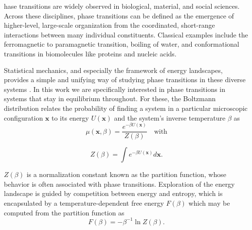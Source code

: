 \documentclass[9pt,twocolumn,twoside]{pnas-new}
\begin{document}
\label{sec:intro}


hase transitions are widely observed in biological, material, and social sciences. Across these disciplines, phase transitions can be defined as the emergence of higher-level, large-scale organization from the coordinated, short-range interactions between many individual constituents. Classical examples include the ferromagnetic to paramagnetic transition, boiling of water, and conformational transitions in biomolecules like proteins and nucleic acids.

Statistical mechanics, and especially the framework of energy landscapes, provides a simple and unifying way of studying phase transitions in these diverse systems \cite{wales-energy-landscapes}. In this work we are specifically interested in phase transitions in systems that stay in equilibrium throughout. For these, the Boltzmann distribution relates the probability of finding a system in a particular microscopic configuration $\mathbf{x}$ to its energy $U(\mathbf{x})$ and the system's inverse temperature $\beta$ as
\begin{equation}
\label{eq:boltzmann}
\mu(\mathbf{x},\beta) = \frac{e^{ -\beta U(\mathbf{x})}}{Z(\beta)} \quad \text{with}
\end{equation}

\begin{equation}
\label{eq:partition-func}
Z(\beta) = \int e^{-\beta U(\mathbf{x})} d\mathbf{x}. 
\end{equation}

$Z(\beta)$ is a normalization constant known as the partition function, whose behavior is often associated with phase transitions. Exploration of the energy landscape is guided by competition between energy and entropy, which is encapsulated by a temperature-dependent free energy $F(\beta)$ which may be computed from the partition function as
\begin{equation}
    \label{eq:free-energy}
    F(\beta) = -\beta^{-1} \ln Z(\beta).
\end{equation}
\end{document}
